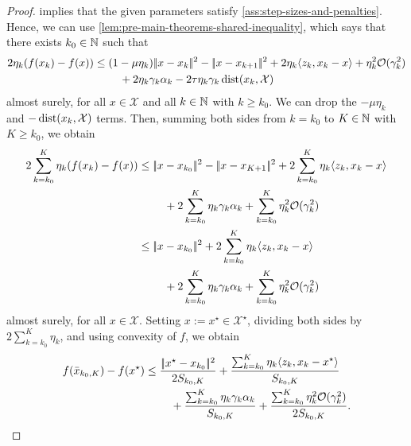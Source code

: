 \begin{proof}
     implies that the given parameters
    satisfy \cref{ass:step-sizes-and-penalties}. Hence, we can use
    \cref{lem:pre-main-theorems-shared-inequality}, which says that there exists $k_0\in\mathbb{N}$ such that
    \begin{align}
        \label{eq:thm:upper-bound-on-f(xk)-f(xstar)-and-dist(xk)}
        2\eta_k (f(x_{k}) - f(x))
        &\leq
        (1-\mu\eta_k)|\!|x - x_k|\!|^2 - |\!|x - x_{k+1}|\!|^2 + 2\eta_k\langle z_k, x_k - x \rangle
            + \eta_k^2 \mathcal{O}(\gamma_k^2) \notag \\
            &\phantom{===} + 2\eta_k\gamma_k\alpha_k - 2\tau \eta_k \gamma_k \operatorname{dist}(x_k, \mathcal{X})
    \end{align}
    almost surely, for all $x\in\mathcal{X}$ and all $k\in\mathbb{N}$ with $k\geq k_0$.
    We can drop the $-\mu\eta_k$ and $-\operatorname{dist}(x_k, \mathcal{X})$ terms. Then,
    summing both sides from $k = k_0$ to $K \in \mathbb{N}$ with $K \geq k_0$,
    we obtain
    \begin{align*}
        2\sum_{k=k_0}^K \eta_k(f(x_k) - f(x))
        &\leq |\!|x - x_{k_0}|\!|^2
            - |\!|x - x_{K+1}|\!|^2
            + 2\sum_{k=k_0}^K \eta_k\langle z_k, x_k - x \rangle \notag \\
        &\phantom{===}
            + 2\sum_{k=k_0}^K \eta_k\gamma_k\alpha_k
            + \sum_{k=k_0}^{K} \eta_k^2\mathcal{O}(\gamma_k^2) \\
        &\leq |\!|x - x_{k_0}|\!|^2
            + 2\sum_{k=k_0}^K \eta_k\langle z_k, x_k - x \rangle \notag \\
        &\phantom{===}
            + 2\sum_{k=k_0}^K \eta_k\gamma_k\alpha_k
            + \sum_{k=k_0}^{K} \eta_k^2\mathcal{O}(\gamma_k^2)
    \end{align*}
    almost surely, for all $x\in\mathcal{X}$.
    Setting $x := x^\star \in \mathcal{X}^\star$, dividing both sides by $2\sum_{k=k_0}^K \eta_k$, and using convexity
    of $f$, we obtain
    \begin{align*}
        f(\bar{x}_{k_0, K}) - f(x^\star)
        &\leq \frac{|\!|x^\star - x_{k_0}|\!|^2}{2S_{k_0, K}}
            + \frac{\sum_{k=k_0}^K \eta_k\langle z_k, x_k - x^\star \rangle}{S_{k_0, K}} \notag \\
        &\phantom{===}
            + \frac{\sum_{k=k_0}^K \eta_k\gamma_k\alpha_k}{S_{k_0, K}}
            + \frac{\sum_{k=k_0}^{K} \eta_k^2\mathcal{O}(\gamma_k^2)}{2 S_{k_0, K}}.
    \end{align*}

\end{proof}
